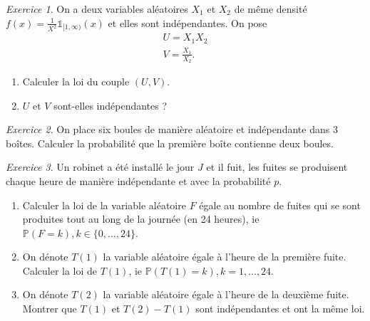 \documentclass[french]{book}
\theoremstyle{definition}
\theoremstyle{remark}
\newtheorem{exo}{Exercice}
\begin{document}
\begin{exo}
  On a deux variables aléatoires \(X_1\) et \(X_2\) de même densité \(f(x) = \frac{1}{X ^2} \mathds{1}_{[1, \infty)}(x)\) et elles sont indépendantes. On pose
  \begin{gather*}
    U = X_1 X_2 \\
    V = \frac{X_1}{X_2}.
  \end{gather*}

  \begin{enumerate}
    \item Calculer la loi du couple \((U,V)\).
    \item \(U \text{ et } V \) sont-elles indépendantes ?
  \end{enumerate}
\end{exo}

\begin{exo}
  On place six boules de manière aléatoire et indépendante dans 3 boîtes. Calculer la probabilité que la première boîte contienne deux boules.
\end{exo}

\begin{exo}
  Un robinet a été installé le jour \(J\) et il fuit, les fuites se produisent chaque heure de manière indépendante et avec la probabilité \(p\).

  \begin{enumerate}
    \item Calculer la loi de la variable aléatoire \(F\) égale au nombre de fuites qui se sont produites tout au long de la journée (en 24 heures), ie \(\mathbb{P}(F=k), k \in \{ 0, \dots, 24 \}\).
    \item On dénote \(T(1)\) la variable aléatoire égale à l'heure de la première fuite. Calculer la loi de \(T(1)\), ie \(\mathbb{P}(T(1) = k), k=1, \dots, 24\).
    \item On dénote \(T(2)\) la variable aléatoire égale à l'heure de la deuxième fuite. Montrer que \(T(1)\) et \(T(2)-T(1)\) sont indépendantes et ont la même loi.
  \end{enumerate}
\end{exo}
\end{document}

